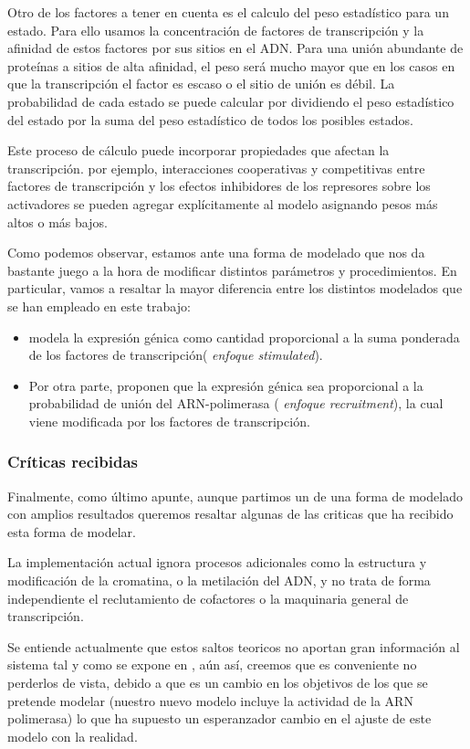  
 Otro de los factores a tener en cuenta es el calculo del peso estadístico para un estado. Para ello usamos la concentración de factores de transcripción
 y la afinidad de estos factores por sus sitios en el ADN. Para una unión abundante de proteínas a sitios de alta afinidad, el peso será mucho mayor que en los casos en que la transcripción el factor es escaso o el sitio de unión es débil.
  La probabilidad de cada estado se puede calcular por
 dividiendo el peso estadístico del estado por la suma del peso estadístico de todos los posibles
 estados. 
 
 
 Este proceso de cálculo puede incorporar propiedades que afectan la transcripción. por ejemplo, interacciones cooperativas y competitivas entre factores de transcripción y los efectos inhibidores de los represores sobre los activadores se pueden agregar explícitamente al modelo asignando pesos más altos o más bajos.
 
 Como podemos observar, estamos ante una forma de modelado que nos da bastante juego a la hora de modificar distintos parámetros y procedimientos. En particular, vamos a resaltar la mayor diferencia entre los distintos modelados que se han empleado en este trabajo:
 \begin{itemize}
 	\item \cite{schaffer} modela la expresión génica como cantidad proporcional a la suma ponderada de los factores de transcripción(\textit{ enfoque stimulated}).
 	\item Por otra parte, \cite{cambon1} proponen que la expresión génica sea proporcional a la probabilidad de unión del ARN-polimerasa (\textit{ enfoque recruitment}), la cual viene modificada por los factores de transcripción.
 		
 		
 	\end{itemize}
 
 
 
 
 \subsubsection{Críticas recibidas}
 
 
 Finalmente, como último apunte, aunque partimos un de una forma de modelado con amplios resultados queremos resaltar algunas de las criticas que ha recibido esta forma de modelar.
 
 La implementación actual ignora procesos adicionales como la estructura y modificación de la cromatina, o la metilación del ADN, y no trata de forma independiente el reclutamiento de cofactores o la maquinaria general de transcripción.
 
  Se entiende actualmente que estos saltos teoricos no aportan gran información al sistema tal y como se expone en \cite{ay2011mathematical}, aún así, creemos que es conveniente no perderlos de vista, debido a que es un cambio en los objetivos de los que se pretende modelar (nuestro nuevo modelo incluye la actividad de la ARN polimerasa) lo que ha supuesto un esperanzador cambio en el ajuste de este modelo con la realidad.